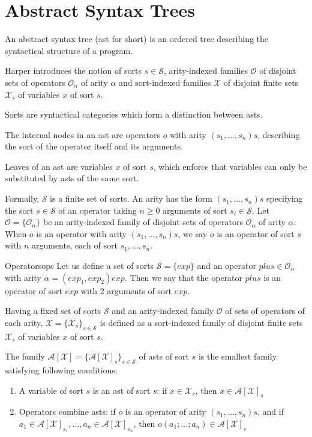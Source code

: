 
\section{Abstract Syntax Trees}
An abstract syntax tree (ast for short) is an ordered tree describing the syntactical structure of a program.

Harper introduces the notion of sorts $s \in \mathcal{S}$, arity-indexed families $\mathcal{O}$ of disjoint sets of operators $\mathcal{O}_\alpha$ of arity $\alpha$ and sort-indexed families $\mathcal{X}$ of disjoint finite sets $\mathcal{X}_s$ of variables $x$ of sort $s$.

Sorts are syntactical categories which form a distinction between asts.

The internal nodes in an ast are operators $o$ with arity $(s_1,...,s_n)s$, describing the sort of the operator itself and its arguments.

Leaves of an ast are variables $x$ of sort $s$, which enforce that variables can only be substituted by asts of the same sort.

Formally,  $\mathcal{S}$ is a finite set of sorts. An arity has the form $(s_1,...,s_n)s$ specifying the sort $s \in \mathcal{S}$ of an operator taking $n \geq 0$ arguments of sort $s_i \in \mathcal{S}$. Let $\mathcal{O} = \{ \mathcal{O}_\alpha \}$ be an arity-indexed family of disjoint sets of operators $\mathcal{O}_\alpha$ of arity $\alpha$. When $o$ is an operator with arity $(s_1,...,s_n)s$, we say $o$ is an operator of sort $s$ with $n$ arguments, each of sort $s_1,...,s_n$.

\begin{example}{Operators}{ops}
    Let us define a set of sorts $\mathcal{S} = \{ exp \}$ and an operator $plus \in \mathcal{O}_\alpha$ with arity $\alpha = (exp_1,exp_2)exp$. Then we say that the operator $plus$ is an operator of sort $exp$ with 2 arguments of sort $exp$.
\end{example}

Having a fixed set of sorts $\mathcal{S}$ and an arity-indexed family $\mathcal{O}$ of sets of operators of each arity, $\mathcal{X} = \{ \mathcal{X}_s \}_{s \in \mathcal{S}}$ is defined as a sort-indexed family of disjoint finite sets $\mathcal{X}_s$ of variables $x$ of sort $s$.

The family $\mathcal{A}[\mathcal{X}] = \{ \mathcal{A}[\mathcal{X}]_s \}_{s \in \mathcal{S}}$ of asts of sort $s$ is the smallest family satisfying following conditions:

\begin{enumerate}
    \item A variable of sort $s$ is an ast of sort $s$: if $x \in \mathcal{X}_s$, then $x \in \mathcal{A}[ \mathcal{X}]_s$
    \item Operators combine asts: if $o$ is an operator of arity $(s_1,...,s_n)s$, and if $a_1 \in \mathcal{A}[\mathcal{X}]_{s_1},...,a_n \in \mathcal{A}[\mathcal{X}]_{s_n}$, then $o(a_1;...;a_n) \in \mathcal{A}[\mathcal{X}]_s$
\end{enumerate}

